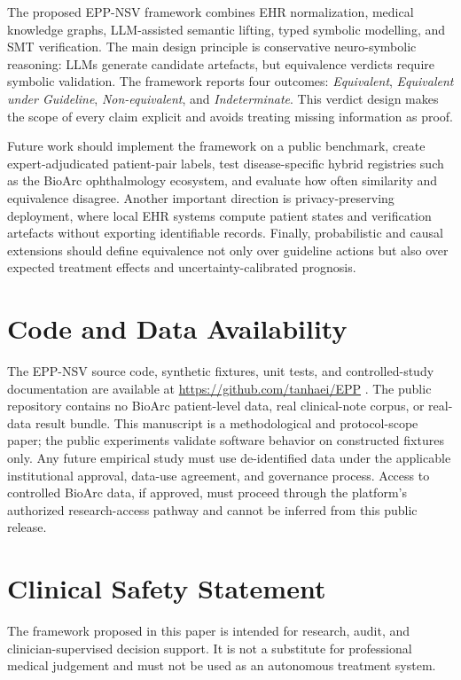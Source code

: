 \documentclass[english,5p,twocolumn,preprint]{elsarticle}
\begin{document}
The proposed EPP-NSV framework combines EHR normalization, medical knowledge graphs, LLM-assisted semantic lifting, typed symbolic modelling, and SMT verification. The main design principle is conservative neuro-symbolic reasoning: LLMs generate candidate artefacts, but equivalence verdicts require symbolic validation. The framework reports four outcomes: \emph{Equivalent}, \emph{Equivalent under Guideline}, \emph{Non-equivalent}, and \emph{Indeterminate}. This verdict design makes the scope of every claim explicit and avoids treating missing information as proof. 

Future work should implement the framework on a public benchmark, create expert-adjudicated patient-pair labels, test disease-specific hybrid registries such as the BioArc ophthalmology ecosystem, and evaluate how often similarity and equivalence disagree. Another important direction is privacy-preserving deployment, where local EHR systems compute patient states and verification artefacts without exporting identifiable records. Finally, probabilistic and causal extensions should define equivalence not only over guideline actions but also over expected treatment effects and uncertainty-calibrated prognosis.

\section*{Code and Data Availability}
The EPP-NSV source code, synthetic fixtures, unit tests, and controlled-study documentation are available at \url{https://github.com/tanhaei/EPP} \cite{tanhaei2026epp}. The public repository contains no BioArc patient-level data, real clinical-note corpus, or real-data result bundle. This manuscript is a methodological and protocol-scope paper; the public experiments validate software behavior on constructed fixtures only. Any future empirical study must use de-identified data under the applicable institutional approval, data-use agreement, and governance process. Access to controlled BioArc data, if approved, must proceed through the platform's authorized research-access pathway and cannot be inferred from this public release.

\section*{Clinical Safety Statement}
The framework proposed in this paper is intended for research, audit, and clinician-supervised decision support. It is not a substitute for professional medical judgement and must not be used as an autonomous treatment system.



\end{document}
